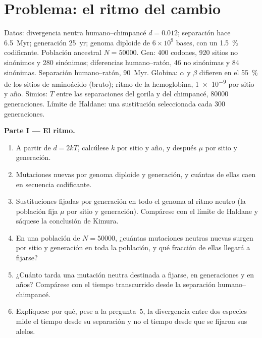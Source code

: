 \section{Problema: el ritmo del cambio}

\begin{problem}
\label{pb:b3:molecular-evolution:1}
Datos: divergencia neutra humano--chimpancé $d = 0.012$; separación hace
\qty{6.5}{Myr}; generación \qty{25}{yr}; genoma diploide de $6\times
10^{9}$ bases, con un \qty{1.5}{\%} codificante. Población ancestral $N =
\num{50000}$. Gen: 400 codones, 920 sitios no sinónimos y 280 sinónimos;
diferencias humano--ratón, 46 no sinónimas y 84 sinónimas. Separación
humano--ratón, \qty{90}{Myr}. Globina: $\alpha$ y $\beta$ difieren en el
\qty{55}{\%} de los sitios de aminoácido (bruto); ritmo de la
hemoglobina, \num{1e-9} por sitio y año. Simios: $T$ entre las
separaciones del gorila y del chimpancé, \num{80000} generaciones.
Límite de Haldane: una sustitución seleccionada cada 300 generaciones.

\medskip
\noindent\textbf{Parte I --- El ritmo.}
\begin{enumerate}
  \item A partir de $d = 2kT$, calcúlese $k$ por sitio y año, y después
        $\mu$ por sitio y generación.
  \item Mutaciones nuevas por genoma diploide y generación, y cuántas de
        ellas caen en secuencia codificante.
  \item Sustituciones fijadas por generación en todo el genoma al ritmo
        neutro (la población fija $\mu$ por sitio y generación).
        Compárese con el límite de Haldane y sáquese la conclusión de
        Kimura.
  \item En una población de $N = \num{50000}$, ¿cuántas mutaciones
        neutras nuevas surgen por sitio y generación en toda la
        población, y qué fracción de ellas llegará a fijarse?
  \item ¿Cuánto tarda una mutación neutra destinada a fijarse, en
        generaciones y en años? Compárese con el tiempo transcurrido
        desde la separación humano--chimpancé.
  \item Explíquese por qué, pese a la pregunta~5, la divergencia entre
        dos especies mide el tiempo desde su separación y no el tiempo
        desde que se fijaron sus alelos.
\end{enumerate}


\end{problem}
